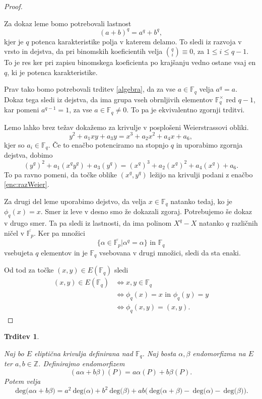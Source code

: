 \documentclass[12pt,a4paper,twoside]{article}
\theoremstyle{definition} %
\theoremstyle{plain} %
\newtheorem{trditev}[definicija]{Trditev}
\numberwithin{equation}{section}  %
\newcommand{\Z}{\mathbb Z}
\newcommand{\F}{\mathbb F}
\newcommand{\Fq}[1]{{\mathbb{F}_{#1}}}
\newcommand{\E}[1]{E({#1})}
\newcommand{\DEG}[1]{\ \text{deg(}{#1}\text{)}}
\begin{document}
\begin{proof}~

Za dokaz leme bomo potrebovali lastnost $$(a+b)^q = a^q+b^q,$$ kjer je $q$ potenca karakteristike polja v katerem delamo. To sledi iz razvoja v vrsto in dejstva, da pri binomskih koeficientih velja
${q\choose i} \equiv 0$, za $1 \leq i \leq q-1$. To je res ker pri zapisu binomskega koeficienta po krajšanju vedno ostane vsaj en $q$, ki je potenca karakteristike. 

Prav tako bomo potrebovali trditev \ref{algebra}, da za vse $a \in \F_q$ velja $a^q = a$. Dokaz tega sledi iz dejstva, da ima grupa vseh obrnljivih elementov $\F^{\times}_q$ red $q-1$, kar pomeni $a^{q-1} = 1$, za vse $a \in \F_q \neq 0$. To pa je ekvivalentno zgornji trditvi.

Lemo lahko brez težav dokažemo za krivulje v posplošeni Weierstrassovi obliki.
\begin{equation}
\label{enc:razWeier}
y^2+a_1xy+a_3y=x^3+a_2x^2+a_4x+a_6,
\end{equation}
kjer so $a_i \in \F_q$. Če to enačbo potenciramo na stopnjo $q$ in uporabimo zgornja dejstva, dobimo
$$(y^q)^2+a_1(x^qy^q)+a_3(y^q)=(x^q)^3+a_2(x^q)^2+a_4(x^q)+a_6.$$
To pa ravno pomeni, da točke oblike $(x^q,y^q)$ ležijo na krivulji podani z enačbo \ref{enc:razWeier}.

Za drugi del leme uporabimo dejstvo, da velja $x \in \F_q$ natanko tedaj, ko je $\phi_q(x) = x$. Smer iz leve v desno smo že dokazali zgoraj. Potrebujemo še dokaz v drugo smer. Ta pa sledi iz lastnosti, da ima polinom $X^q-X$ natanko $q$ različnih ničel v $\overline{\F_p}$. Ker pa množici
$$\{ \alpha \in \overline{\F_p} | \alpha^q = \alpha \} \text{ in } \F_q$$
vsebujeta $q$ elementov in je $\F_q$ vsebovana v drugi množici, sledi da sta enaki.

Od tod za točke $(x,y) \in \E{\Fq{q}}$ sledi
\begin{align}
(x,y) \in E(\F_q) &{}\Leftrightarrow x,y \in \F_q \nonumber \\
&{}  \Leftrightarrow \phi_q(x) = x \text{ in } \phi_q(y) = y  \nonumber \\
&{} \Leftrightarrow \phi_q(x,y) = (x,y). \nonumber
\end{align} 

\end{proof}

\begin{trditev}~

\label{trd:3.16}
Naj bo $E$ eliptična krivulja definirana nad $\Fq{q}$.
Naj bosta $\alpha,\beta$ endomorfizma na $E$ ter $a,b \in \Z$. Definirajmo endomorfizem
$$(a\alpha+b\beta)(P) = a\alpha(P)+b\beta(P).$$
Potem velja
$$\DEG{a\alpha+b\beta} = a^2\DEG{\alpha}+b^2\DEG{\beta} + ab\text{(}\DEG{\alpha+\beta}-\DEG{\alpha}-\DEG{\beta}\text{)}.$$
\end{trditev}
\end{document}
